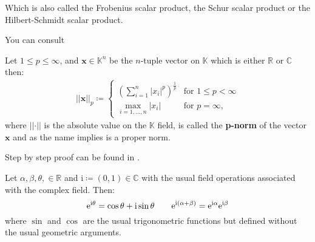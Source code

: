 Which is also called the Frobenius scalar product, the Schur scalar product or 
the Hilbert-Schmidt scalar product.

\begin{Proof}
    You can consult \cite{Frazier1999}\cite{Horn2012}\cite{Hackbusch2019}
\end{Proof}
\begin{Def}\label{def:p-norm}
    Let $1 \leq p \leq \infty$, and $\boldsymbol{x} \in \mathbb{K}^n$ be the $n$-tuple vector on $\mathbb{K}$ which is either $\mathbb{R}$ or $\mathbb{C}$ then:
    \begin{equation*}
        \begin{split} 
            \left|\left|\boldsymbol{x}\right|\right|_p \coloneqq    
            \begin{cases}
                \left(\sum_{i=1}^{n}\left|x_i\right|^p\right)^{\frac{1}{p}} & \text{for } 1 \leq p < \infty\\
                \underset{{i=1,\dots,n}}{\max} \left|x_i\right| & \text{for } p = \infty,
            \end{cases}
        \end{split}
    \end{equation*}
    where $\left|\left|\boldsymbol{\cdot}\right|\right|$  is the absolute value on the $\mathbb{K}$ field,
    is called the \textbf{p-norm} of the vector $\boldsymbol{x}$ and as the name implies is a proper norm.
\end{Def}
\begin{Proof}
    Step by step proof can be found in \cite{Alt2016}.
\end{Proof}
\begin{Thm}\label{theorem:euler_formula}
    Let $\alpha,\beta,\theta, \in \mathbb{R}$ and $\mathrm{i} \coloneqq (0,1) \in \mathbb{C}$  with the usual field operations associated with the 
	complex field. Then:
	\begin{equation*}
		\mathrm{e}^{\mathrm{i}\theta} = \cos \theta +  \mathrm{i}\sin \theta \qquad  \mathrm{e}^{\mathrm{i}(\alpha+\beta)} = \mathrm{e}^{\mathrm{i}\alpha}\mathrm{e}^{\mathrm{i}\beta}\index{Euler formula}\index{Function!$\exp$}\index{Function!$\sin$}\index{Function!$\cos$}
	\end{equation*}
    where $\sin$ and $\cos$ are the usual trigonometric functions but defined without the usual geometric arguments.
	\end{Thm}
